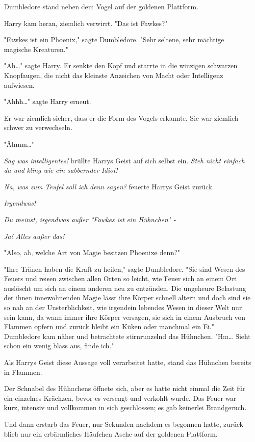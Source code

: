 {Dumbledore stand neben dem Vogel auf der goldenen Plattform.

Harry kam heran, ziemlich verwirrt. "Das ist Fawkes?"

"Fawkes ist ein Phoenix," sagte Dumbledore. "Sehr seltene, sehr mächtige magische Kreaturen."

"Ah…" sagte Harry. Er senkte den Kopf und starrte in die winzigen schwarzen Knopfaugen, die nicht das kleinste Anzeichen von Macht oder Intelligenz aufwiesen.

"Ahhh…" sagte Harry erneut.

Er war ziemlich sicher, dass er die Form des Vogels erkannte. Sie war ziemlich schwer zu verwechseln.

"Ähmm…"

\emph{Sag was intelligentes!} brüllte Harrys Geist auf sich selbst ein. \emph{Steh nicht einfach da und kling wie ein sabbernder Idiot!}

\emph{Na, was zum Teufel soll ich denn sagen?} feuerte Harrys Geist zurück.

\emph{Irgendwas!}

\emph{Du meinst, irgendwas außer "Fawkes ist ein Hühnchen" -}

\emph{Ja! Alles außer das!}

"Also, ah, welche Art von Magie besitzen Phoenixe denn?"

"Ihre Tränen haben die Kraft zu heilen," sagte Dumbledore. "Sie sind Wesen des Feuers und reisen zwischen allen Orten so leicht, wie Feuer sich an einem Ort auslöscht um sich an einem anderen neu zu entzünden. Die ungeheure Belastung der ihnen innewohnenden Magie lässt ihre Körper schnell altern und doch sind sie so nah an der Unsterblichkeit, wie irgendein lebendes Wesen in dieser Welt nur sein kann, da wann immer ihre Körper versagen, sie sich in einem Ausbruch von Flammen opfern und zurück bleibt ein Küken oder manchmal ein Ei." Dumbledore kam näher und betrachtete stirnrunzelnd das Hühnchen. "Hm… Sieht schon ein wenig blass aus, finde ich."

Als Harrys Geist diese Aussage voll verarbeitet hatte, stand das Hühnchen bereits in Flammen.

Der Schnabel des Hühnchens öffnete sich, aber es hatte nicht einmal die Zeit für ein einzelnes Krächzen, bevor es versengt und verkohlt wurde. Das Feuer war kurz, intensiv und vollkommen in sich geschlossen; es gab keinerlei Brandgeruch.

Und dann erstarb das Feuer, nur Sekunden nachdem es begonnen hatte, zurück blieb nur ein erbärmliches Häufchen Asche auf der goldenen Plattform.

}
